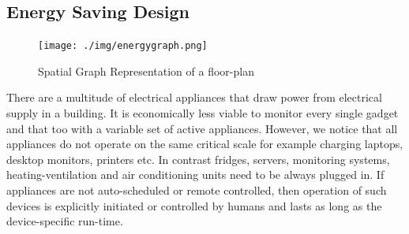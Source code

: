 

\subsection{Energy Saving Design }

\begin{figure}[h!]
\centering
  \texttt{[image: ./img/energygraph.png]}
  \caption{ Spatial Graph Representation of a floor-plan}
  \label{fig:energygraph}
\end{figure}


There are a multitude of electrical appliances that draw power from electrical supply in a building. It is economically less viable to monitor every single gadget and that too with a variable set of active appliances. However, we notice that all appliances do not operate on the same critical scale for example charging laptops, desktop monitors, printers etc. In contrast fridges, servers, monitoring systems, heating-ventilation and air conditioning units need to be always plugged in. If appliances are not auto-scheduled or remote controlled, then operation of such devices is explicitly initiated or controlled by humans and lasts as long as the device-specific run-time. 

